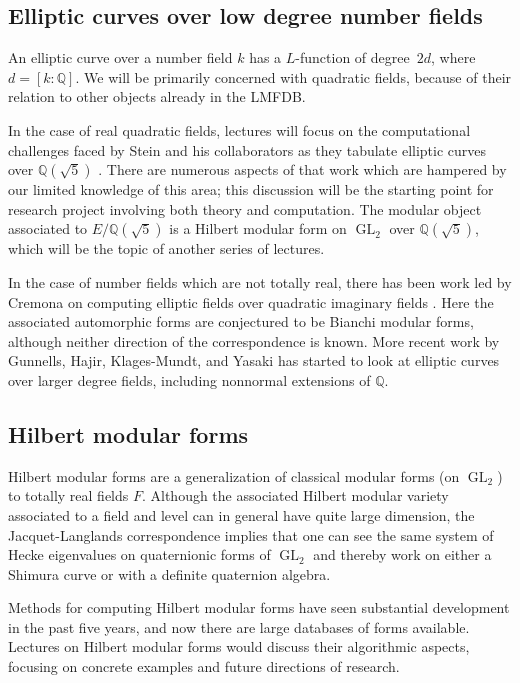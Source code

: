 \documentclass[12pt]{amsart}
\DeclareMathOperator{\GL}{GL}
\numberwithin{equation}{section}
\newcommand{\Q}{\mathbb Q}
\begin{document}
\subsection{Elliptic curves over low degree number fields}

An elliptic curve over a number field $k$ has a $L$-function of
degree~$2d$, where $d=[k:\Q]$.  We will be primarily concerned with
quadratic fields, because of their relation to other objects already
in the \textsf{LMFDB}.

In the case of real quadratic fields, lectures will focus on the
computational challenges faced by Stein and his collaborators as they
tabulate elliptic curves over $\Q(\sqrt5)$ \cite{sqrt5first}.  There
are numerous 
aspects of that work which are hampered by our limited knowledge
of this area; this discussion will be the starting point for research
project involving both theory and computation.
%
The modular object associated to $E/\Q(\sqrt5)$ is a Hilbert modular
form on $\GL_2$ over $\Q(\sqrt5)$, which will be the topic of another
series of lectures.

In the case of number fields which are not totally real, there has
been work led by Cremona on computing elliptic fields over quadratic
imaginary fields \cite{cremona1, cremona-lingham, cremona}.  Here the
associated automorphic forms are
conjectured to be Bianchi modular forms, although neither direction of
the correspondence is known.  More recent work by Gunnells,
Hajir, Klages-Mundt, and Yasaki \cite{complexcubic, neg23,quartic}
has started to look at elliptic curves over larger degree
fields, including nonnormal extensions of $\Q$.

\subsection{Hilbert modular forms}

Hilbert modular forms are a generalization of classical modular forms
(on $\GL_2$) to totally real fields $F$.  Although the associated 
Hilbert modular variety associated to a field and level can in general
have quite large dimension, the Jacquet-Langlands correspondence
implies that one can see the same system of Hecke eigenvalues
on quaternionic forms of $\GL_2$ and thereby work on either
a Shimura curve or with a definite quaternion algebra.

Methods for computing Hilbert modular forms have seen substantial
development in the past five years, and now there are large databases
of forms available.  Lectures on Hilbert modular forms would discuss
their algorithmic aspects, focusing on concrete examples and 
future directions of research.
\end{document}
